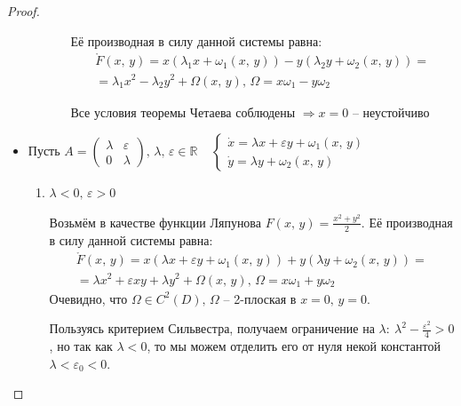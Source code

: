 \documentclass[a4paper,12pt]{article}
\theoremstyle{plain}
\theoremstyle{definition}
\theoremstyle{remark}
\begin{document}
\begin{proof}
\begin{itemize}
\begin{enumerate}
\begin{itemize}
				                  Её производная в силу данной системы равна: 
													\begin{align*}
														\mathring{F}(x,\,y) = x(\lambda_1x + \omega_1(x,\,y)) - y(\lambda_2y + \omega_2(x,\,y)) = \\
														=\lambda_1x^2 - \lambda_2y^2 + \Omega(x,\,y),\, \Omega = x\omega_1 - y\omega_2
													\end{align*}
													
				                  Все условия теоремы Четаева соблюдены $\Rightarrow x = 0$ -- неустойчиво
			            \end{itemize}
		      \end{enumerate}

		\item Пусть $A = \begin{pmatrix}
				      \lambda & \varepsilon \\
				      0       & \lambda
			      \end{pmatrix},\, \lambda,\, \varepsilon \in \mathbb{R}\;\;\;\; \begin{cases}
				      \dot{x} = \lambda x + \varepsilon y + \omega_1(x,\,y) \\
				      \dot{y} = \lambda y + \omega_2(x,\,y)
			      \end{cases}$

		      \begin{enumerate}
			      \item $\lambda < 0,\, \varepsilon > 0$

			            Возьмём в качестве функции Ляпунова $F(x,\,y) = \frac{x^2 + y^2}{2}$. Её производная в силу данной системы равна:
									\begin{align*}
										\mathring{F}(x,\,y) = x(\lambda x + \varepsilon y + \omega_1(x,\,y)) + y(\lambda y + \omega_2(x,\,y)) = \\
										= \lambda x^2 + \varepsilon xy + \lambda y^2 + \Omega(x,\,y),\, \Omega = x\omega_1 + y\omega_2
									\end{align*}
			            Очевидно, что $\Omega \in C^2(D),\, \Omega$ -- 2-плоская в $x = 0,\, y = 0$.

			            Пользуясь критерием Сильвестра, получаем ограничение на $\lambda:\: \lambda^2 - \frac{\varepsilon^2}{4} > 0$, но так как $\lambda < 0$, то мы можем отделить его от нуля некой константой $\lambda < \varepsilon_0 < 0$.


\end{enumerate}
\end{itemize}
\end{proof}
\end{document}
